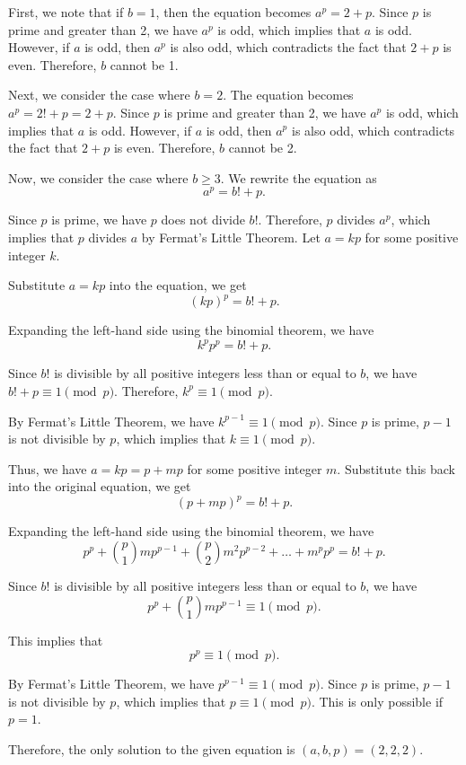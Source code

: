 First, we note that if \( b = 1 \), then the equation becomes \( a^p = 2 + p \). Since \( p \) is prime and greater than 2, we have \( a^p \) is odd, which implies that \( a \) is odd. However, if \( a \) is odd, then \( a^p \) is also odd, which contradicts the fact that \( 2 + p \) is even. Therefore, \( b \) cannot be 1.

Next, we consider the case where \( b = 2 \). The equation becomes \( a^p = 2! + p = 2 + p \). Since \( p \) is prime and greater than 2, we have \( a^p \) is odd, which implies that \( a \) is odd. However, if \( a \) is odd, then \( a^p \) is also odd, which contradicts the fact that \( 2 + p \) is even. Therefore, \( b \) cannot be 2.

Now, we consider the case where \( b \geq 3 \). We rewrite the equation as
\[ a^p = b! + p. \]

Since \( p \) is prime, we have \( p \) does not divide \( b! \). Therefore, \( p \) divides \( a^p \), which implies that \( p \) divides \( a \) by Fermat's Little Theorem. Let \( a = kp \) for some positive integer \( k \).

Substitute \( a = kp \) into the equation, we get
\[ (kp)^p = b! + p. \]

Expanding the left-hand side using the binomial theorem, we have
\[ k^p p^p = b! + p. \]

Since \( b! \) is divisible by all positive integers less than or equal to \( b \), we have \( b! + p \equiv 1 \pmod{p} \). Therefore, \( k^p \equiv 1 \pmod{p} \).

By Fermat's Little Theorem, we have \( k^{p-1} \equiv 1 \pmod{p} \). Since \( p \) is prime, \( p-1 \) is not divisible by \( p \), which implies that \( k \equiv 1 \pmod{p} \).

Thus, we have \( a = kp = p + mp \) for some positive integer \( m \). Substitute this back into the original equation, we get
\[ (p + mp)^p = b! + p. \]

Expanding the left-hand side using the binomial theorem, we have
\[ p^p + \binom{p}{1}mp^{p-1} + \binom{p}{2}m^2p^{p-2} + \ldots + m^p p^p = b! + p. \]

Since \( b! \) is divisible by all positive integers less than or equal to \( b \), we have
\[ p^p + \binom{p}{1}mp^{p-1} \equiv 1 \pmod{p}. \]

This implies that
\[ p^p \equiv 1 \pmod{p}. \]

By Fermat's Little Theorem, we have \( p^{p-1} \equiv 1 \pmod{p} \). Since \( p \) is prime, \( p-1 \) is not divisible by \( p \), which implies that \( p \equiv 1 \pmod{p} \). This is only possible if \( p = 1 \).

Therefore, the only solution to the given equation is \( (a,b,p) = (2,2,2) \).
